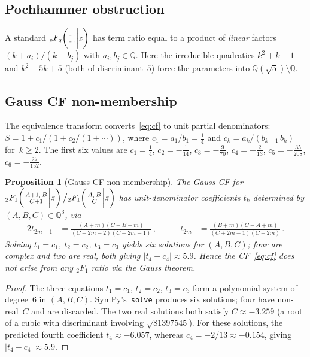 \documentclass[11pt]{article}
\newcommand{\hyp}[5]{{{}_{#1}F_{#2}}\!\left(\genfrac{}{}{0pt}{}{#3}{#4}\bigg|#5\right)}
\newtheorem{proposition}[theorem]{Proposition}
\theoremstyle{remark}
\begin{document}
\subsection{Pochhammer obstruction}

A standard $\hyp{p}{q}{\cdots}{\cdots}{z}$ has term ratio equal to
a product of \emph{linear} factors $(k+a_i)/(k+b_j)$ with
$a_i,b_j\in\mathbb{Q}$.  Here the irreducible quadratics
$k^2+k-1$ and $k^2+5k+5$ (both of discriminant~$5$) force the
parameters into $\mathbb{Q}(\sqrt5)\setminus\mathbb{Q}$.

\subsection{Gauss CF non-membership}

The equivalence transform converts~\eqref{eq:cf} to unit partial
denominators: $S = 1 + c_1/(1 + c_2/(1 + \cdots))$, where
$c_1 = a_1/b_1 = \tfrac{1}{4}$ and
$c_k = a_k/(b_{k-1}\,b_k)$ for~$k\geq 2$.  The first six
values are $c_1 = \tfrac{1}{4}$,
$c_2 = -\tfrac{1}{14}$, $c_3 = -\tfrac{9}{70}$,
$c_4 = -\tfrac{2}{13}$, $c_5 = -\tfrac{35}{208}$,
$c_6 = -\tfrac{27}{152}$.

\begin{proposition}[Gauss CF non-membership]\label{prop:gauss}
The Gauss CF for
$\hyp21{A{+}1,\,B}{C{+}1}{z}\big/\hyp21{A,\,B}{C}{z}$
has unit-denominator coefficients $t_k$ determined by
$(A,B,C)\in\mathbb{Q}^3$, via
\begin{alignat*}{2}
  t_{2m-1} &= \frac{(A{+}m)(C{-}B{+}m)}{(C{+}2m{-}2)(C{+}2m{-}1)}\,,
  &\qquad
  t_{2m} &= \frac{(B{+}m)(C{-}A{+}m)}{(C{+}2m{-}1)(C{+}2m)}\,.
\end{alignat*}
Solving $t_1{=}c_1$, $t_2{=}c_2$, $t_3{=}c_3$ yields six solutions
for $(A,B,C)$; four are complex and two are real, both giving
$|t_4 - c_4| \approx 5.9$.  Hence the CF~\eqref{eq:cf} does not
arise from any ${}_2F_1$ ratio via the Gauss theorem.
\end{proposition}

\begin{proof}
The three equations $t_1 = c_1$, $t_2 = c_2$, $t_3 = c_3$ form
a polynomial system of degree~$6$ in $(A,B,C)$.
SymPy's~\texttt{solve} produces six solutions; four have
non-real~$C$ and are discarded.  The two real solutions both satisfy
$C \approx -3.259$ (a root of a cubic with discriminant involving
$\sqrt{81397545}$).  For these solutions, the predicted fourth coefficient
$t_4 \approx -6.057$, whereas $c_4 = -2/13 \approx -0.154$, giving
$|t_4 - c_4| \approx 5.9$.
\end{proof}
\end{document}
